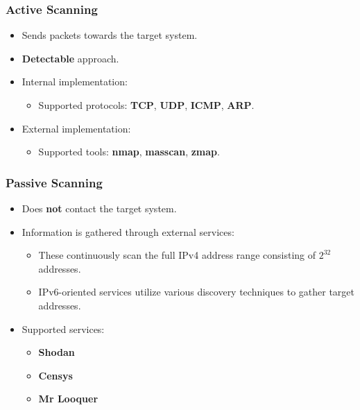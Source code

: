 \documentclass[aspectratio=169,xcolor={usenames,dvipsnames}]{beamer}
\newcommand{\ispace}{\vspace{10pt}}
\begin{document}
\begin{frame}
	\frametitle{Active Scanning}
	
	\begin{itemize}
		\item Sends packets towards the target system.
		\item \textbf{Detectable} approach.
	\end{itemize}
	
	\ispace
	
	\begin{itemize}
		\item Internal implementation:
		\begin{itemize}
			\item Supported protocols: \textbf{TCP}, \textbf{UDP}, \textbf{ICMP}, \textbf{ARP}.
		\end{itemize}
	\end{itemize}
	
	\ispace
	
	\begin{itemize}
		\item External implementation:
		\begin{itemize}
			\item Supported tools: \textbf{nmap}, \textbf{masscan}, \textbf{zmap}.
		\end{itemize}
	\end{itemize}
\end{frame}

\begin{frame}
	\frametitle{Passive Scanning}
	
	\begin{itemize}
		\item Does \textbf{not} contact the target system.
		\item Information is gathered through external services:
		\begin{itemize}
			\item These continuously scan the full IPv4 address range consisting of $2^{32}$ addresses.
			\item IPv6-oriented services utilize various discovery techniques to gather target addresses.
		\end{itemize}
	\end{itemize}
	
	\ispace
	
	\begin{itemize}
		\item Supported services:
		\begin{itemize}
			\item \textbf{Shodan}
			\item \textbf{Censys}
			\item \textbf{Mr Looquer}
		\end{itemize}
	\end{itemize}
\end{frame}
\end{document}
